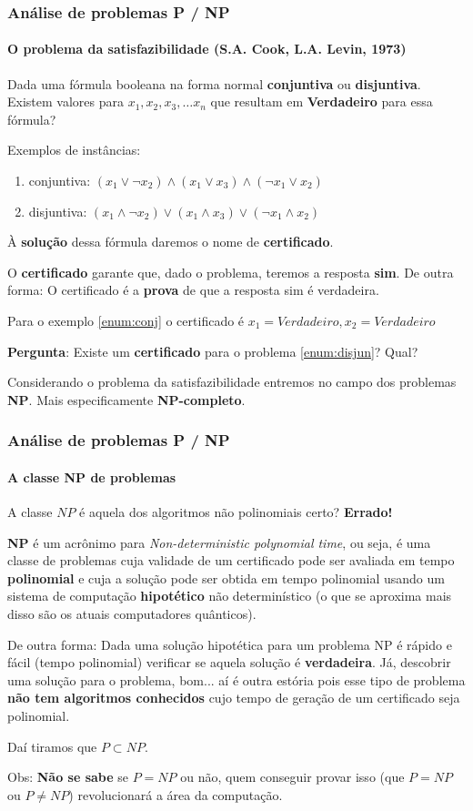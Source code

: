 \begin{frame}
	\frametitle{Análise de problemas P / NP}
	\framesubtitle{O problema da satisfazibilidade  (S.A. Cook, L.A. Levin, 1973)}
	\par Dada uma fórmula booleana na forma normal \textbf{conjuntiva} ou \textbf{disjuntiva}. Existem valores para $x_1,x_2,x_3, \dots x_n$ que resultam em \textbf{Verdadeiro} para essa fórmula?
	\par Exemplos de instâncias:
	\begin{enumerate}
		\item conjuntiva: $(x_1 \vee \neg x_2)\wedge(x_1 \vee x_3)\wedge(\neg x_1 \vee x_2)$ \label{enum:conj}
		\item disjuntiva: $(x_1 \wedge \neg x_2)\vee(x_1 \wedge x_3)\vee(\neg x_1 \wedge x_2)$\label{enum:disjun}
	\end{enumerate}
	\par À \textbf{solução} dessa fórmula daremos o nome de \textbf{certificado}.
	\par O \textbf{certificado} garante que, dado o problema, teremos a resposta \textbf{sim}. De outra forma: O certificado é a \textbf{prova} de que a resposta sim é verdadeira.
	\par Para o exemplo \ref{enum:conj} o certificado é $x_1=Verdadeiro, x_2=Verdadeiro$\newline
	
	\par \textbf{Pergunta}: Existe um \textbf{certificado} para o problema \ref{enum:disjun}? Qual?
	
	\par Considerando o problema da satisfazibilidade entremos no campo dos problemas \textbf{NP}. Mais especificamente \textbf{NP-completo}.
\end{frame}

\begin{frame}
	\frametitle{Análise de problemas P / NP}
	\framesubtitle{A classe NP de problemas}
	\par A classe $NP$ é aquela dos algoritmos não polinomiais certo? \textbf{Errado!}
	\par \textbf{NP} é um acrônimo para \textit{Non-deterministic polynomial time}, ou seja, é uma classe de problemas cuja validade de um certificado pode ser avaliada em tempo \textbf{polinomial} e cuja a solução pode ser obtida em tempo polinomial usando um sistema de computação \textbf{hipotético} não determinístico (o que se aproxima mais disso são os atuais computadores quânticos).
	\par De outra forma: Dada uma solução hipotética para um problema NP é rápido e fácil (tempo polinomial) verificar se aquela solução é \textbf{verdadeira}. Já, descobrir uma solução para o problema, bom... aí é outra estória pois esse tipo de problema \textbf{não tem algoritmos conhecidos} cujo tempo de geração de um certificado seja polinomial.
	\par Daí tiramos que $P \subset NP$.
	\par Obs: \textbf{Não se sabe} se $P = NP$ ou não, quem conseguir provar isso (que $P = NP$ ou  $P \neq NP$) revolucionará a área da computação.	
\end{frame}

